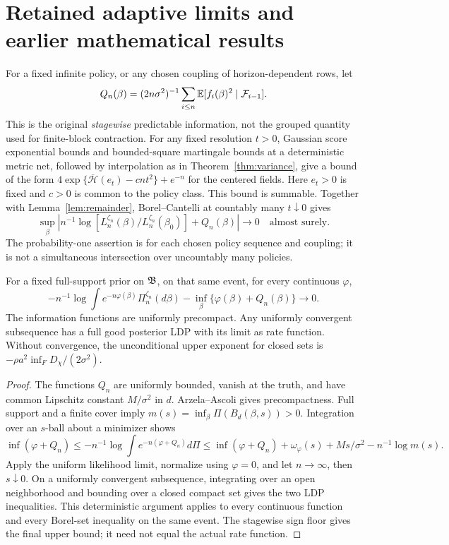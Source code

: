 \section{Retained adaptive limits and earlier mathematical results}
For a fixed infinite policy, or any chosen coupling of horizon-dependent rows,
let
\[
 Q_n(\beta)=(2n\sigma^2)^{-1}\sum_{i\le n}
                \mathbb E[f_i(\beta)^2\mid\mathcal F_{i-1}].
\]
This is the original \emph{stagewise} predictable information, not the grouped
quantity used for finite-block contraction. For any fixed resolution $t>0$,
Gaussian score exponential bounds and bounded-square martingale bounds at a
deterministic metric net, followed by interpolation as in
Theorem~\ref{thm:variance}, give a bound of the form
$4\exp\{\overline{\mathcal H}(e_t)-cnt^2\}+e^{-n}$ for the centered fields.
Here $e_t>0$ is fixed and $c>0$ is common to the policy class. This bound is
summable. Together with Lemma~\ref{lem:remainder}, Borel--Cantelli at countably
many $t\downarrow0$ gives
\[
 \sup_\beta\left|n^{-1}\log
 [L_n^{\zeta_n}(\beta)/L_n^{\zeta_n}(\beta_0)]+Q_n(\beta)\right|\to0
 \quad\text{almost surely}.
\]
The probability-one assertion is for each chosen policy sequence and coupling;
it is not a simultaneous intersection over uncountably many policies.

\begin{proposition}
\label{prop:ldp}
For a fixed full-support prior on $\mathfrak B$, on that same event, for every
continuous $\varphi$,
\[
 -n^{-1}\log\int e^{-n\varphi(\beta)}\Pi_n^{\zeta_n}(d\beta)
       -\inf_\beta\{\varphi(\beta)+Q_n(\beta)\}\to0.
\]
The information functions are uniformly precompact. Any uniformly convergent
subsequence has a full good posterior LDP with its limit as rate function.
Without convergence, the unconditional upper exponent for closed sets is
$-\rho a^2\inf_FD_\chi/(2\sigma^2)$.
\end{proposition}
\begin{proof}
The functions $Q_n$ are uniformly bounded, vanish at the truth, and have common
Lipschitz constant $M/\sigma^2$ in $d$. Arzela--Ascoli gives precompactness.
Full support and a finite cover imply $m(s)=\inf_\beta\Pi(B_d(\beta,s))>0$.
Integration over an $s$-ball about a minimizer shows
\[
 \inf(\varphi+Q_n)\le-n^{-1}\log\int e^{-n(\varphi+Q_n)}d\Pi
 \le\inf(\varphi+Q_n)+\omega_\varphi(s)+Ms/\sigma^2-n^{-1}\log m(s).
\]
Apply the uniform likelihood limit, normalize using $\varphi=0$, and let
$n\to\infty$, then $s\downarrow0$. On a uniformly convergent subsequence,
integrating over an open neighborhood and bounding over a closed compact set
gives the two LDP inequalities. This deterministic argument applies to every
continuous function and every Borel-set inequality on the same event.
The stagewise sign floor gives the final upper bound; it need not equal the
actual rate function.
\end{proof}

